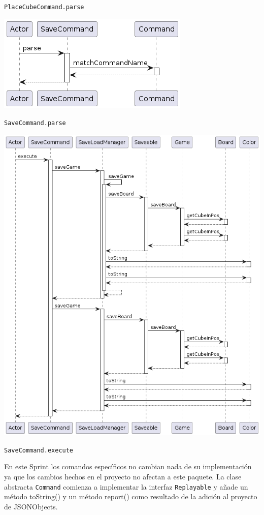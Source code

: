 \documentclass[../DocumentoOficial.tex]{subfiles}
\begin{document}
\begin{sprint}[2]
\begin{center}
\texttt{PlaceCubeCommand.parse}
\end{center}
\begin{center}
\includegraphics[scale=0.5]{SaveCommand_parse.png}

\texttt{SaveCommand.parse}
\end{center}
\begin{center}
\includegraphics[scale=0.5]{SaveCommand_execute2.png}

\texttt{SaveCommand.execute}
\end{center}


\end{sprint}

\begin{sprint}[3]
En este Sprint los comandos específicos no cambian nada de su implementación ya que los cambios hechos en el proyecto no afectan a este paquete. La clase abstracta \texttt{Command} comienza a implementar la interfaz \texttt{Replayable} y añade un método toString() y un método report() como resultado de la adición al proyecto de JSONObjects.
\end{sprint}
\end{document}
